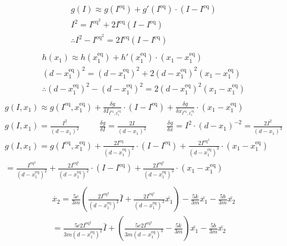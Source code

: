     \begin{align}\nonumber
        {g(I) \approx g(I^\text{eq})+g'(I^\text{eq}) \cdot (I - I^\text{eq})} \\ \nonumber
        {I^2 = I^\text{eq}^2 +2I^\text{eq}(I - I^\text{eq})} \\ \nonumber
        \therefore {I^2 - I^\text{eq}^2 =2I^\text{eq}(I - I^\text{eq})} \\ \nonumber
    \end{align}
    \begin{align}\nonumber
        {h(x_1) \approx h(x_1^\text{eq})+h'(x_1^\text{eq}) \cdot (x_1 - x_1^\text{eq})} \\ \nonumber
        {(d -{x_1^\text{eq}})^2 =(d -{x_1^\text{eq}})^2 +2(d -{x_1^\text{eq}})^2(x_1 - x_1^\text{eq})} \\ \nonumber
        \therefore {(d -{x_1^\text{eq}})^2 -(d -{x_1^\text{eq}})^2 = 2(d -{x_1^\text{eq}})^2(x_1 - x_1^\text{eq})} \\ \nonumber
    \end{align}
    \begin{align}\nonumber
        g(I, x_1) \approx g(I^\text{eq}, x_1^\text{eq}) + \frac{\delta g}{\delta I_{I^\text{eq}, x_1^\text{eq}}}\cdot (I - I^\text{eq}) + \frac{\delta g}{\delta x_{I^\text{eq}, x_1^\text{eq}}}\cdot (x_1 - x_1^\text{eq}) \\ \nonumber
        g(I, x_1) = \frac{I^2}{(d -{x_1})^2} \hspace{1cm} \frac{\delta g}{\delta I} = \frac{2I}{(d -{x_1})^2}\hspace{1cm} \frac{\delta g}{\delta x} = I^2 \cdot {(d -{x_1})^{-2}} = \frac{2I^2}{(d -{x_1})^3}\\ \nonumber
        g(I, x_1) = g(I^{\text{eq}}, x_1^{\text{eq}}) +  \frac{2I^{\text{eq}}}{(d -{x_1^{\text{eq}}})^2} \cdot (I - I^{\text{eq}}) + \frac{2I^{\text{eq}}^2}{(d -{x_1^\text{eq}})^3} \cdot {(x_1 - x_1^\text{eq})}\\ \nonumber
        = \frac{I^\text{eq}^2}{(d -{x_1^\text{eq}})^2} + \frac{2I^\text{eq}^2}{(d -{x_1^\text{eq}})^2} \cdot (I - I^\text{eq}) + \frac{2I^\text{eq}^2}{(d -{x_1^\text{eq}})^3} \cdot (x_1 - x_1^\text{eq}) \\ \nonumber
    \end{align}
    \begin{align}\nonumber
        \dot{x_2} = \frac{5c}{3m}(\frac{2I^\text{eq}^2}{(d -{x_1^\text{eq}})^2} \bar{I} + \frac{2I^\text{eq}^2}{(d -{x_1^\text{eq}})^3}\bar{x_1}) - \frac{5k}{3m}\bar{x_1} - \frac{5b}{3m}\bar{x_2} \\ \nonumber
        = \frac{{5c}2I^\text{eq}^2}{3m(d -{x_1^\text{eq}})^2} \bar{I} +( \frac{5c2I^\text{eq}^2}{3m(d -{x_1^\text{eq}})^3} - \frac{5k}{3m})\bar{x_1} - \frac{5b}{3m}\bar{x_2} \\ \nonumber
    \end{align}
